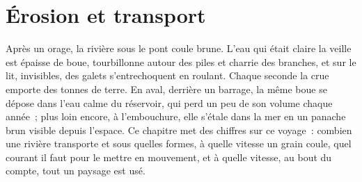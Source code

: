 \chapter{Érosion et transport}\label{ch:b1:erosion-transport}

Après un orage, la rivière sous le pont coule brune. L'eau qui était claire
la veille est épaisse de boue, tourbillonne autour des piles et charrie
des branches, et sur le lit, invisibles, des galets s'entrechoquent en
roulant. Chaque seconde la crue emporte des tonnes de terre. En aval,
derrière un barrage, la même boue se dépose dans l'eau calme du réservoir, qui
perd un peu de son volume chaque année~; plus loin encore, à l'embouchure,
elle s'étale dans la mer en un panache brun visible depuis l'espace. Ce
chapitre met des chiffres sur ce voyage~: combien une rivière transporte et sous quelles
formes, à quelle vitesse un grain coule, quel courant il faut pour le mettre en mouvement, et
à quelle vitesse, au bout du compte, tout un paysage est usé.

